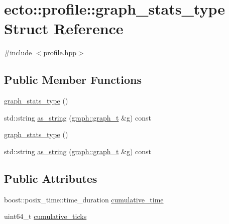 \hypertarget{structecto_1_1profile_1_1graph__stats__type}{\section{ecto\-:\-:profile\-:\-:graph\-\_\-stats\-\_\-type Struct Reference}
\label{structecto_1_1profile_1_1graph__stats__type}
}


{\ttfamily \#include $<$profile.\-hpp$>$}

\subsection*{Public Member Functions}
\begin{DoxyCompactItemize}
\item 
\hyperlink{structecto_1_1profile_1_1graph__stats__type_aefc20d119cb949420bf74e845a8a1e8c}{graph\-\_\-stats\-\_\-type} ()
\item 
std\-::string \hyperlink{structecto_1_1profile_1_1graph__stats__type_ab412a3b91cbd9b062cdcd0f078ca163d}{as\-\_\-string} (\hyperlink{structecto_1_1graph_1_1graph__t}{graph\-::graph\-\_\-t} \&g) const 
\item 
\hyperlink{structecto_1_1profile_1_1graph__stats__type_aefc20d119cb949420bf74e845a8a1e8c}{graph\-\_\-stats\-\_\-type} ()
\item 
std\-::string \hyperlink{structecto_1_1profile_1_1graph__stats__type_ab412a3b91cbd9b062cdcd0f078ca163d}{as\-\_\-string} (\hyperlink{structecto_1_1graph_1_1graph__t}{graph\-::graph\-\_\-t} \&g) const 
\end{DoxyCompactItemize}
\subsection*{Public Attributes}
\begin{DoxyCompactItemize}
\item 
boost\-::posix\-\_\-time\-::time\-\_\-duration \hyperlink{structecto_1_1profile_1_1graph__stats__type_a340d79ae72ca5639e55098c860640ba8}{cumulative\-\_\-time}
\item 
uint64\-\_\-t \hyperlink{structecto_1_1profile_1_1graph__stats__type_a0d465d23569a8af1789c0b57ccb21017}{cumulative\-\_\-ticks}
\end{DoxyCompactItemize}


